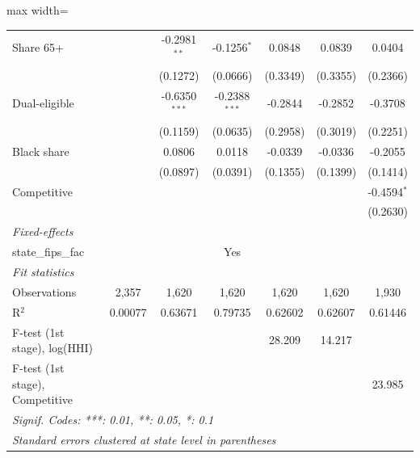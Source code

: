 \begin{table}[htbp]
\begin{adjustbox}{max width=\textwidth}
\begin{tabular}{lcccccc}
      Share 65+                       &               & -0.2981$^{**}$  & -0.1256$^{*}$   & 0.0848        & 0.0839        & 0.0404\\   
                                      &               & (0.1272)        & (0.0666)        & (0.3349)      & (0.3355)      & (0.2366)\\   
      Dual-eligible                   &               & -0.6350$^{***}$ & -0.2388$^{***}$ & -0.2844       & -0.2852       & -0.3708\\   
                                      &               & (0.1159)        & (0.0635)        & (0.2958)      & (0.3019)      & (0.2251)\\   
      Black share                     &               & 0.0806          & 0.0118          & -0.0339       & -0.0336       & -0.2055\\   
                                      &               & (0.0897)        & (0.0391)        & (0.1355)      & (0.1399)      & (0.1414)\\   
      Competitive                     &               &                 &                 &               &               & -0.4594$^{*}$\\   
                                      &               &                 &                 &               &               & (0.2630)\\   
      \midrule
      \emph{Fixed-effects}\\
      state\_fips\_fac                &               &                 & Yes             &               &               & \\  
      \midrule
      \emph{Fit statistics}\\
      Observations                    & 2,357         & 1,620           & 1,620           & 1,620         & 1,620         & 1,930\\  
      R$^2$                           & 0.00077       & 0.63671         & 0.79735         & 0.62602       & 0.62607       & 0.61446\\  
      F-test (1st stage), log(HHI)    &               &                 &                 & 28.209        & 14.217        & \\  
      F-test (1st stage), Competitive &               &                 &                 &               &               & 23.985\\  
      \midrule \midrule
      \multicolumn{7}{l}{\emph{Signif. Codes: ***: 0.01, **: 0.05, *: 0.1}}\\
      \multicolumn{7}{l}{\emph{Standard errors clustered at state level in parentheses}}\\
   \end{tabular}
   \end{adjustbox}
\end{table}


